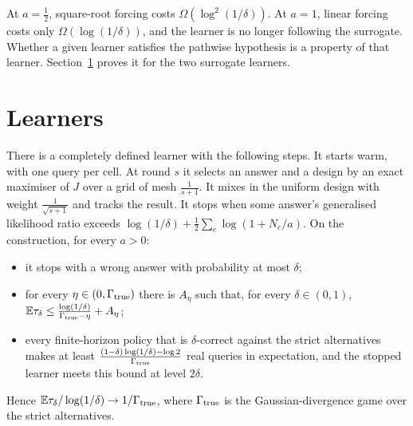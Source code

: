 
At $a=\frac12$, square-root forcing costs $\Omega(\log^{2}(1/\delta))$. At $a=1$, linear
forcing costs only $\Omega(\log(1/\delta))$, and the learner is no longer following the
surrogate. Whether a given learner satisfies the pathwise hypothesis is a property of that
learner. Section~\ref{sec:learners} proves it for the two surrogate learners.

\section{Learners}
\label{sec:learners}

\begin{theorem}
\label{thm:ideal}
There is a completely defined learner with the following steps. It starts warm, with one query
per cell. At round $s$ it selects an answer and a design by an exact maximiser of $J$ over a
grid of mesh $\frac{1}{s+1}$. It mixes in the uniform design with weight
$\frac{1}{\sqrt{s+1}}$ and tracks the result. It stops when some answer's generalised
likelihood ratio exceeds $\log(1/\delta)+\frac12\sum_{e}\log(1+N_{e}/a)$. On the construction,
for every $a>0$:
\begin{itemize}
\item it stops with a wrong answer with probability at most $\delta$;
\item for every $\eta\in(0,\Gamma_{\rm true})$ there is $A_{\eta}$ such that, for every
$\delta\in(0,1)$, $\mathbb{E}\tau_{\delta}\le\frac{\log(1/\delta)}{\Gamma_{\rm true}-\eta}+A_{\eta}$;
\item every finite-horizon policy that is $\delta$-correct against the strict alternatives
makes at least $\frac{(1-\delta)\log(1/\delta)-\log2}{\Gamma_{\rm true}}$ real queries in
expectation, and the stopped learner meets this bound at level $2\delta$.
\end{itemize}
Hence $\mathbb{E}\tau_{\delta}/\log(1/\delta)\to1/\Gamma_{\rm true}$, where $\Gamma_{\rm true}$ is
the Gaussian-divergence game over the strict alternatives.
\end{theorem}


